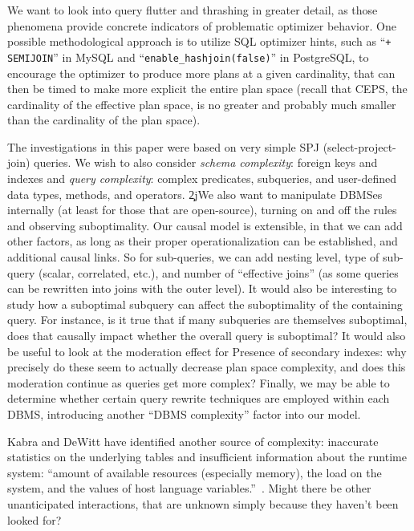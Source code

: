 \documentclass[prodmode,acmtods]{acmsmall}
\begin{document}
We want to look into query flutter and thrashing in greater detail, as those phenomena
provide concrete indicators of problematic optimizer behavior. One
possible methodological approach is to utilize SQL optimizer hints, such as
``{\tt \*+ SEMIJOIN}'' in MySQL and ``{\tt enable\_hashjoin(false)}'' in PostgreSQL,
to encourage the optimizer to produce more plans at a given cardinality,
that can then be timed to make more explicit the entire plan space (recall that
CEPS, the cardinality of the effective plan space, is no greater and
probably much smaller than the cardinality of the plan space).

The investigations in this paper were based on very simple SPJ (select-project-join)
queries.  We wish to also consider {\em schema complexity}: 
foreign keys and indexes and {\em query complexity}: complex predicates, subqueries,
and user-defined data types, methods, and operators. \c2j{}{We also want
  to manipulate \hbox{DBMSes} internally (at least for those that are open-source),
  turning on and off the rules and observing suboptimality.} Our causal
model is extensible, in that we can add other factors, as long as their proper
operationalization can be established, and additional causal links.
So for
sub-queries, we can add nesting level, type of sub-query (scalar,
correlated, etc.), and number of ``effective joins''  (as some queries can
be rewritten into joins with the outer level).
It would also be interesting to study how a suboptimal subquery can affect
the suboptimality of the containing query.  For instance, is it true that if
many subqueries are themselves suboptimal, does that causally impact whether
the overall query is suboptimal? It would also be useful to look at the
moderation effect for Presence of secondary indexes: why precisely do these seem to
actually decrease plan space complexity, and does this moderation continue
as queries get more complex? Finally, we may be able to determine
whether certain query rewrite techniques are employed within each \hbox{DBMS},
introducing another ``\hbox{DBMS} complexity'' factor into our model.

Kabra and
\hbox{DeWitt} have identified another source of complexity: inaccurate
statistics on the underlying tables and insufficient information about the
runtime system: ``amount of available resources (especially memory), the
load on the system, and the values of host language
variables.''~\cite[p.~106]{kabra98}.  Might there be other unanticipated
interactions, that are unknown simply because they haven't been
looked for?
\end{document}
